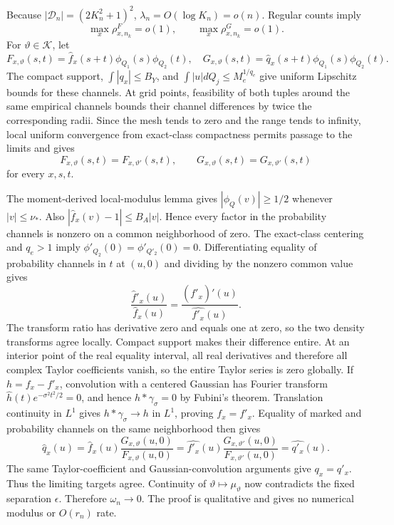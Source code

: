 Because \(|\mathcal D_n|=(2K_n^2+1)^2\), \(\lambda_n=O(\log K_n)=o(n)\). Regular counts imply
\[
 \max_x\rho^F_{x,n_k}=o(1),
 \qquad \max_x\rho^G_{x,n_k}=o(1).
\]
For \(\vartheta\in\mathscr K\), let
\[
 F_{x,\vartheta}(s,t)=\widehat f_x(s+t)\phi_{Q_1}(s)\phi_{Q_2}(t),
 \quad
 G_{x,\vartheta}(s,t)=\widehat q_x(s+t)\phi_{Q_1}(s)\phi_{Q_2}(t).
\]
The compact support, \(\int|q_x|\le B_Y\), and \(\int|u|dQ_j\le M_e^{1/q_e}\) give uniform Lipschitz bounds for these channels. At grid points, feasibility of both tuples around the same empirical channels bounds their channel differences by twice the corresponding radii. Since the mesh tends to zero and the range tends to infinity, local uniform convergence from exact-class compactness permits passage to the limits and gives
\[
 F_{x,\vartheta}(s,t)=F_{x,\vartheta'}(s,t),
 \qquad
 G_{x,\vartheta}(s,t)=G_{x,\vartheta'}(s,t)
\]
for every \(x,s,t\).

The moment-derived local-modulus lemma gives \(|\phi_Q(v)|\ge1/2\) whenever \(|v|\le\nu_*\). Also \(|\widehat f_x(v)-1|\le B_A|v|\). Hence every factor in the probability channels is nonzero on a common neighborhood of zero. The exact-class centering and \(q_e>1\) imply \(\phi'_{Q_2}(0)=\phi'_{Q'_2}(0)=0\). Differentiating equality of probability channels in \(t\) at \((u,0)\) and dividing by the nonzero common value gives
\[
 \frac{\widehat f'_x(u)}{\widehat f_x(u)}
 =\frac{(\widehat{f'_x})'(u)}{\widehat{f'_x}(u)}.
\]
The transform ratio has derivative zero and equals one at zero, so the two density transforms agree locally. Compact support makes their difference entire. At an interior point of the real equality interval, all real derivatives and therefore all complex Taylor coefficients vanish, so the entire Taylor series is zero globally. If \(h=f_x-f'_x\), convolution with a centered Gaussian has Fourier transform \(\widehat h(t)e^{-\sigma^2t^2/2}=0\), and hence \(h*\gamma_\sigma=0\) by Fubini's theorem. Translation continuity in \(L^1\) gives \(h*\gamma_\sigma\to h\) in \(L^1\), proving \(f_x=f'_x\). Equality of marked and probability channels on the same neighborhood then gives
\[
 \widehat q_x(u)=\widehat f_x(u)\frac{G_{x,\vartheta}(u,0)}{F_{x,\vartheta}(u,0)}
 =\widehat{f'_x}(u)\frac{G_{x,\vartheta'}(u,0)}{F_{x,\vartheta'}(u,0)}
 =\widehat{q'_x}(u).
\]
The same Taylor-coefficient and Gaussian-convolution arguments give \(q_x=q'_x\). Thus the limiting targets agree. Continuity of \(\vartheta\mapsto\mu_\vartheta\) now contradicts the fixed separation \(\epsilon\). Therefore \(\omega_n\to0\). The proof is qualitative and gives no numerical modulus or \(O(r_n)\) rate.

